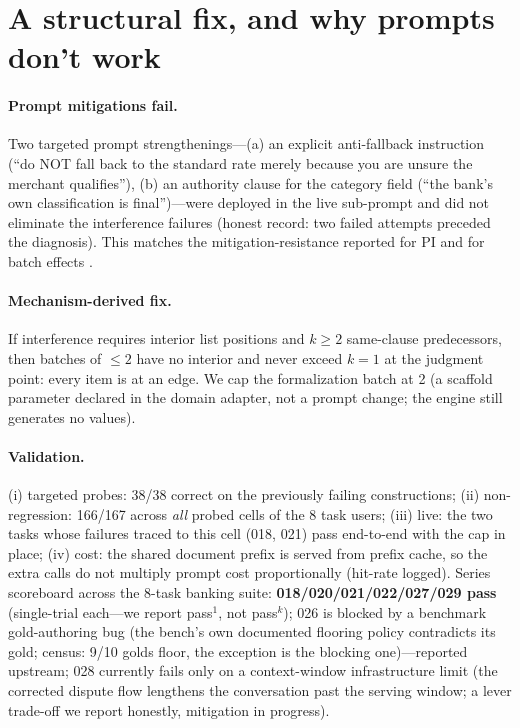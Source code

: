 \section{A structural fix, and why prompts don't work}
\label{sec:fix}

\paragraph{Prompt mitigations fail.}
Two targeted prompt strengthenings---(a) an explicit anti-fallback instruction (``do NOT fall back to the
standard rate merely because you are unsure the merchant qualifies''), (b) an authority clause for the
category field (``the bank's own classification is final'')---were deployed in the live sub-prompt and did not
eliminate the interference failures (honest record: two failed attempts preceded the diagnosis). This matches
the mitigation-resistance reported for PI \citep[prompting ``entirely fails'']{wang2025unable} and for batch
effects \citep[BatchPrompt resorts to permutation and voting rather than instructions]{lin2023batchprompt}.

\paragraph{Mechanism-derived fix.}
If interference requires interior list positions and $k \ge 2$ same-clause predecessors, then batches of
$\le 2$ have no interior and never exceed $k{=}1$ at the judgment point: every item is at an edge. We cap the
formalization batch at 2 (a scaffold parameter declared in the domain adapter, not a prompt change; the engine
still generates no values).

\paragraph{Validation.}
(i) targeted probes: 38/38 correct on the previously failing constructions; (ii) non-regression: 166/167
across \emph{all} probed cells of the 8 task users; (iii) live: the two tasks whose failures traced to this
cell (018, 021) pass end-to-end with the cap in place; (iv) cost: the shared document prefix is served from
prefix cache, so the extra calls do not multiply prompt cost proportionally (hit-rate logged). Series
scoreboard across the 8-task banking suite: \textbf{018/020/021/022/027/029 pass} (single-trial each---we
report pass$^1$, not pass$^k$); 026 is blocked by a benchmark gold-authoring bug (the bench's own documented
flooring policy contradicts its gold; census: 9/10 golds floor, the exception is the blocking one)---reported
upstream; 028 currently fails only on a context-window infrastructure limit (the corrected dispute flow
lengthens the conversation past the serving window; a lever trade-off we report honestly, mitigation in
progress).

